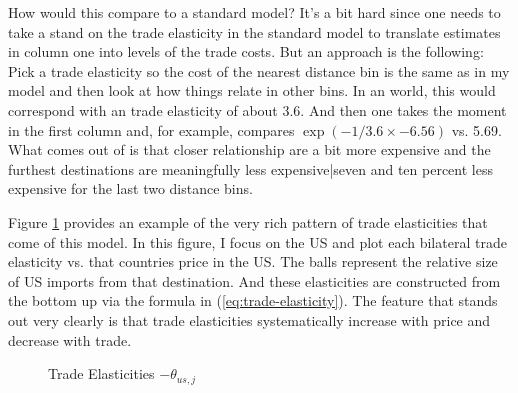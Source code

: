 \documentclass[12pt,pdftex]{article}
\begin{document}
\begin{onehalfspacing}
How would this compare to a standard model? It's a bit hard since one needs to take a stand on the trade elasticity in the standard model to translate estimates in column one into levels of the trade costs. But an approach is the following: Pick a trade elasticity so the cost of the nearest distance bin is the same as in my model and then look at how things relate in other bins. In an \citet{eaton2002technology} world, this would correspond with an trade elasticity of about 3.6. And then one takes the moment in the first column and, for example, compares $\exp( - 1 / 3.6 \times  -6.56)$ vs. 5.69.  What comes out of is that closer relationship are a bit more expensive and the furthest destinations are meaningfully less expensive|seven and ten percent less expensive for the last two distance bins.

Figure \ref{fig:bilateral-elasticities} provides an example of the very rich pattern of trade elasticities that come of this model. In this figure, I focus on the US and plot each bilateral trade elasticity vs. that countries price in the US. The balls represent the relative size of US imports from that destination. And these elasticities are constructed from the bottom up via the formula in (\ref{eq:trade-elasticity}). The feature that stands out very clearly is that trade elasticities systematically increase with price and decrease with trade.

\begin{figure}[!t]
\caption{Trade Elasticities $-\theta_{us,j}$}\label{fig:bilateral-elasticities}
\end{figure}



\end{onehalfspacing}
\end{document}
